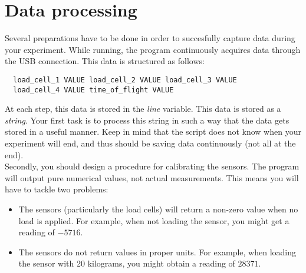 \documentclass{article}
\begin{document}
 \section{Data processing}
 Several preparations have to be done in order to succesfully capture data during your experiment. While running, the program continuously acquires data through the USB connection. This data is structured as follows:
 \begin{lstlisting}
  load_cell_1 VALUE load_cell_2 VALUE load_cell_3 VALUE
  load_cell_4 VALUE time_of_flight VALUE
 \end{lstlisting}
 At each step, this data is stored in the \textit{line} variable. This data is stored as a \textit{string}. Your first task is to process this string in such a way that the data gets stored in a useful manner. Keep in mind that the script does not know when your experiment will end, and thus should be saving data continuously (not all at the end).\\

 Secondly, you should design a procedure for calibrating the sensors. The program will output pure numerical values, not actual measurements. This means you will have to tackle two problems:
 \begin{itemize}
  \item The sensors (particularly the load cells) will return a non-zero value when no load is applied. For example, when not loading the sensor, you might get a reading of $-5716$.
  \item The sensors do not return values in proper units. For example, when loading the sensor with 20 kilograms, you might obtain a reading of $28371$.
 \end{itemize}
\end{document}
